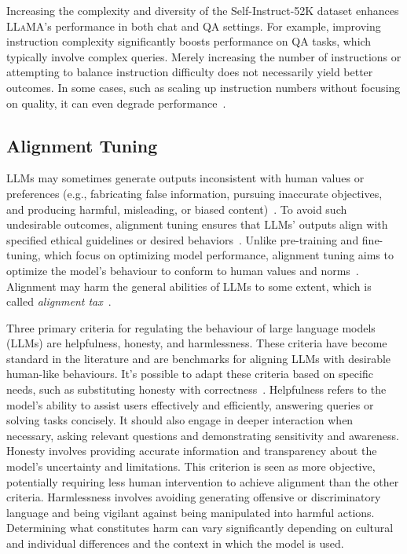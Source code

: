 Increasing the complexity and diversity of the Self-Instruct-52K dataset enhances \textsc{LLaMA}'s performance in both chat and QA settings.
For example, improving instruction complexity significantly boosts performance on QA tasks, which typically involve complex queries.
Merely increasing the number of instructions or attempting to balance instruction difficulty does not necessarily yield better outcomes.
In some cases, such as scaling up instruction numbers without focusing on quality, it can even degrade performance~\cite{survey}.

\subsection{Alignment Tuning}
\label{subsec:alignment-tuning}

LLMs may sometimes generate outputs inconsistent with human values or preferences (e.g., fabricating false information, pursuing inaccurate objectives, and producing harmful, misleading, or biased content)~\cite{ouyang2022training, kenton2021alignment}.
To avoid such undesirable outcomes, alignment tuning ensures that LLMs' outputs align with specified ethical guidelines or desired behaviors~\cite{survey}.
Unlike pre-training and fine-tuning, which focus on optimizing model performance, alignment tuning aims to optimize the model's behaviour to conform to human values and norms~\cite{survey}.
Alignment may harm the general abilities of LLMs to some extent, which is called \textit{alignment tax}~\cite{askell2021general}.

Three primary criteria for regulating the behaviour of large language models (LLMs) are helpfulness, honesty, and harmlessness.
These criteria have become standard in the literature and are benchmarks for aligning LLMs with desirable human-like behaviours.
It's possible to adapt these criteria based on specific needs, such as substituting honesty with correctness~\cite{glaese2022improving}.
Helpfulness refers to the model's ability to assist users effectively and efficiently, answering queries or solving tasks concisely.
It should also engage in deeper interaction when necessary, asking relevant questions and demonstrating sensitivity and awareness.
Honesty involves providing accurate information and transparency about the model's uncertainty and limitations.
This criterion is seen as more objective, potentially requiring less human intervention to achieve alignment than the other criteria.
Harmlessness involves avoiding generating offensive or discriminatory language and being vigilant against being manipulated into harmful actions.
Determining what constitutes harm can vary significantly depending on cultural and individual differences and the context in which the model is used.

